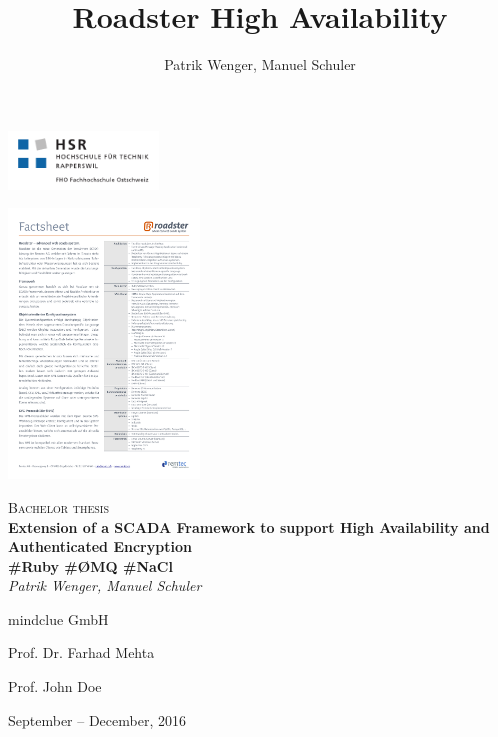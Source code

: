 \documentclass[a4paper]{report}
\title{Roadster High Availability}
\author{Patrik Wenger, Manuel Schuler}
\begin{document}


\thispagestyle{empty}

\begin{titlepage}
\centering
\begin{raggedleft}\includegraphics[trim=10 10 10 10, clip=true, width=0.3\textwidth]{img/hsr_logo.pdf}\end{raggedleft}
\begin{raggedright}\hfill\includegraphics[trim=14.8cm 27cm 1cm 1.4cm, clip=true, width=0.38\textwidth]{img/roadster_factsheet.pdf}\end{raggedright}

\vspace{50mm}
{\scshape\Large Bachelor thesis\\}
\vspace{2cm}
{\huge\bfseries Extension of a SCADA Framework to support High Availability and Authenticated Encryption\\}
\vspace{1cm}
{\huge\bfseries \#Ruby \#\O{}MQ \#NaCl\\}
\vspace{2cm}
{\Large\itshape Patrik Wenger, Manuel Schuler\\}
\vfill
\begin{center}
\begin{varwidth}{\textwidth}
\begin{description}
	\large
	\item [client:] mindclue GmbH
	\item [supervisor:] Prof. Dr. Farhad Mehta
	\item [expert:] Prof. John Doe %
\end{description}
\end{varwidth}
\end{center}
\vfill
{\large September -- December, 2016\\}
\end{titlepage}
\end{document}
